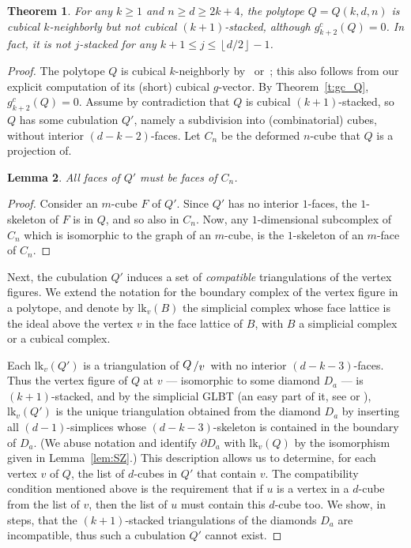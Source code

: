 \documentclass[a4paper,leqno]{article}
\newtheorem{theorem}{Theorem}%
\newtheorem{lemma}[theorem]{Lemma}
\theoremstyle{definition}
\newcommand{\lk}{\mathrm{lk}}
\newcommand{\gc}{g^c}
\newcommand{\dhalf}[1]{\left\lfloor #1/2\right\rfloor}
\newcommand{\vfig}[2]{{\raisebox{.1em}{$#1$}\left/\raisebox{-.1em}{$#2$}\right.}}
\begin{document}
\begin{theorem}\label{prop:notStacked}
For any $k\ge 1$ and $n\ge d\ge 2k+4$, the polytope $Q=Q(k,d,n)$ is cubical $k$-neighborly but not cubical $(k+1)$-stacked,
although $\gc_{k+2}(Q)=0$.
In fact, it is not $j$-stacked for any $k+1 \le j \le \dhalf{d}-1$.
\end{theorem}
\begin{proof}
The polytope $Q$ is cubical $k$-neighborly by~\cite[Theorem 16]{JoswZ00} or~\cite[Theorem 3.2]{SanyZ10}; this also follows from our explicit computation of its (short) cubical $g$-vector.
By Theorem~\ref{t:gc_Q}, $\gc_{k+2}(Q)=0$.
Assume by contradiction that $Q$ is cubical $(k+1)$-stacked, so $Q$ has some cubulation $Q'$, namely a subdivision into (combinatorial) cubes, without interior $(d-k-2)$-faces.
Let $C_n$ be the deformed $n$-cube that $Q$ is a projection of.
\begin{lemma}\label{lem:cubulationBySubcubes}
All faces of $Q'$ must be faces of $C_n$.
\end{lemma}
\begin{proof}
Consider an $m$-cube $F$ of $Q'$. Since $Q'$ has no interior $1$-faces, the $1$-skeleton of $F$ is in $Q$, and so also in $C_n$. Now, any $1$-dimensional subcomplex of $C_n$ which is isomorphic to the graph of an $m$-cube, is the $1$-skeleton of an $m$-face of $C_n$.
\end{proof}

Next, the cubulation $Q'$ induces a set of \emph{compatible} triangulations of the vertex figures. We extend the notation for the boundary complex of the vertex figure in a polytope, and denote by $\lk_v(B)$ the simplicial complex whose face lattice is the ideal above the vertex $v$ in the face lattice of $B$, with $B$ a simplicial complex or a cubical complex.

Each $\lk_v(Q')$ is a triangulation of $\vfig{Q}{v}$ with no interior $(d-k-3)$-faces.
Thus the vertex figure of $Q$ at $v$ --- isomorphic to some diamond $D_a$ --- is $(k+1)$-stacked, and by the simplicial GLBT (an easy part of it, see \cite[Thm.2.3(ii)]{MuraN13} or \cite[Thm.2.12]{Bagchi-Datta}), $\lk_v(Q')$ is the unique triangulation obtained from the diamond $D_a$  by inserting all
$(d-1)$-simplices whose $(d-k-3)$-skeleton is contained in the boundary of $D_a$.
(We abuse notation and identify $\partial D_a$ with $\lk_v(Q)$ by the isomorphism given in Lemma~\ref{lem:SZ}.)
This description allows us to determine, for each vertex $v$ of $Q$, the list of $d$-cubes in $Q'$ that contain $v$. The compatibility condition mentioned above is the requirement that if $u$ is a vertex in a $d$-cube from the list of $v$, then the list of $u$ must contain this $d$-cube too.
We show, in steps, that the $(k+1)$-stacked triangulations of the diamonds $D_a$ are incompatible, thus such a cubulation $Q'$ cannot exist.


\end{proof}
\end{document}
